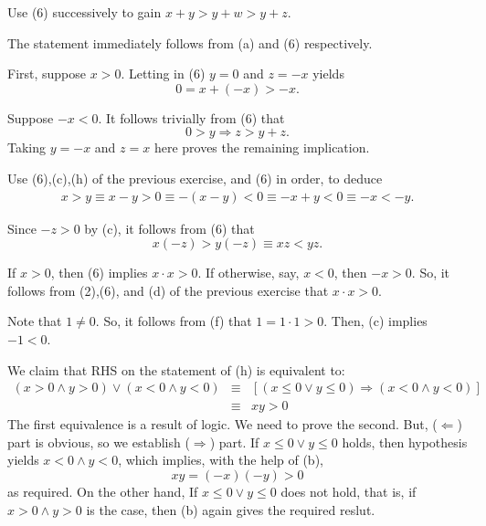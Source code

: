 \documentclass[a4paper,12pt]{article}
\begin{document}
\begin{sol}\leavevmode \par
	Use (6) successively to gain
	\( x+y > y+w > y+z \).
	
	The statement immediately follows from (a) and (6) respectively.
	
	First, suppose
	\( x>0 \).
	Letting in (6)
	\( y=0 \)
	and
	\( z=-x \)
	yields
	\begin{equation*}
		0 = x+(-x) > -x.
	\end{equation*}
	
	Suppose
	\( -x<0 \).
	It follows trivially from (6) that
	\begin{equation*}
		0 > y 
		\Rightarrow
		z> y+z.
	\end{equation*}
	Taking
	\( y=-x \)
	and
	\( z=x \)
	here proves the remaining implication.
	
	Use (6),(c),(h) of the previous exercise, and (6) in order,
	to deduce
	\begin{eqnarray*}
		x>y
		\equiv
		x-y >0
		\equiv
		-(x-y)<0
		\equiv
		-x+y<0
		\equiv
		-x<-y.
	\end{eqnarray*}
	
	Since
	\( -z>0 \)
	by (c),
	it follows from (6) that
	\begin{equation*}
		x(-z) > y(-z)
		\equiv
		xz< yz.
	\end{equation*}
	
	If
	\( x>0 \),
	then (6) implies 
	\( x \cdot x > 0\).
	If otherwise, say,
	\( x<0 \),
	then
	\( -x>0 \).
	So, it follows from (2),(6), and (d) of the previous exercise that
	\( x \cdot x>0 \).
	
	Note that
	\( 1 \neq 0 \).
	So, it follows from (f) that
	\( 1=1 \cdot 1 >0 \).
	Then, (c) implies
	\( -1 <0 \).
	
	We claim that
	RHS on the statement of (h) is equivalent to:
	\begin{eqnarray*}
		\left( x>0 \wedge y>0 \right)
		\vee
		\left( x<0 \wedge y<0 \right)
		&\equiv&
		\left[
			\left( x \le 0 \vee y \le 0 \right)
			\Rightarrow
			\left( x<0 \wedge y< 0 \right)
			\right]\\
		&\equiv&
		xy>0
	\end{eqnarray*}
	The first equivalence is a result of logic.
	We need to prove the second.
	But, (\( \Leftarrow \)) part is obvious,
	so we establish (\( \Rightarrow \)) part.
	If
	\( x \le 0 \vee y \le 0 \)
	holds,
	then hypothesis yields 
	\( x<0 \wedge y< 0 \),
	which implies, with the help of (b),
	\begin{equation*}
		xy= (-x)(-y)>0
	\end{equation*}
	as required.
	On the other hand, If 
	\( x \le 0 \vee y \le 0 \)
	does not hold, that is, if
	\( x>0 \wedge y>0 \)
	is the case,
	then (b) again gives the required reslut.
	

\end{sol}
\end{document}
